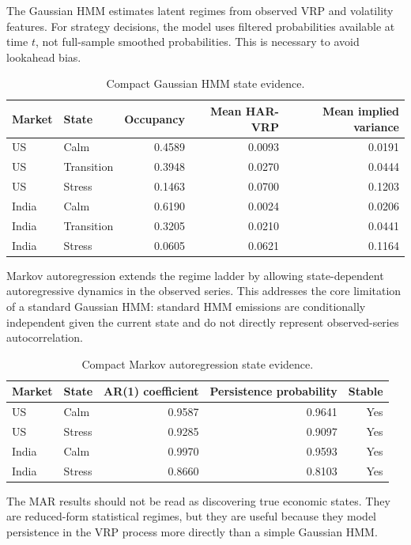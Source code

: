 \documentclass[11pt,a4paper]{article}
\begin{document}
The Gaussian HMM estimates latent regimes from observed VRP and volatility features. For strategy decisions, the model uses filtered probabilities available at time $t$, not full-sample smoothed probabilities. This is necessary to avoid lookahead bias.

\begin{table}[H]
\centering
\caption{Compact Gaussian HMM state evidence.}
\begin{tabular}{llrrr}
\toprule
Market & State & Occupancy & Mean HAR-VRP & Mean implied variance \\
\midrule
US & Calm & 0.4589 & 0.0093 & 0.0191 \\
US & Transition & 0.3948 & 0.0270 & 0.0444 \\
US & Stress & 0.1463 & 0.0700 & 0.1203 \\
India & Calm & 0.6190 & 0.0024 & 0.0206 \\
India & Transition & 0.3205 & 0.0210 & 0.0441 \\
India & Stress & 0.0605 & 0.0621 & 0.1164 \\
\bottomrule
\end{tabular}
\end{table}

Markov autoregression extends the regime ladder by allowing state-dependent autoregressive dynamics in the observed series. This addresses the core limitation of a standard Gaussian HMM: standard HMM emissions are conditionally independent given the current state and do not directly represent observed-series autocorrelation.

\begin{table}[H]
\centering
\caption{Compact Markov autoregression state evidence.}
\begin{tabular}{llrrr}
\toprule
Market & State & AR(1) coefficient & Persistence probability & Stable \\
\midrule
US & Calm & 0.9587 & 0.9641 & Yes \\
US & Stress & 0.9285 & 0.9097 & Yes \\
India & Calm & 0.9970 & 0.9593 & Yes \\
India & Stress & 0.8660 & 0.8103 & Yes \\
\bottomrule
\end{tabular}
\end{table}

The MAR results should not be read as discovering true economic states. They are reduced-form statistical regimes, but they are useful because they model persistence in the VRP process more directly than a simple Gaussian HMM.
\end{document}
